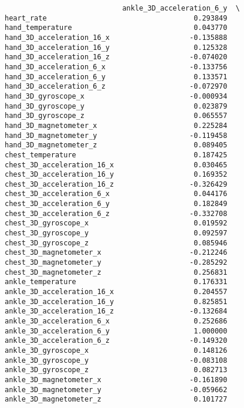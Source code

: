 \documentclass[11pt]{article}
\begin{document}
\begin{verbatim}
                            ankle_3D_acceleration_6_y  \
heart_rate                                   0.293849   
hand_temperature                             0.043770   
hand_3D_acceleration_16_x                   -0.135888   
hand_3D_acceleration_16_y                    0.125328   
hand_3D_acceleration_16_z                   -0.074020   
hand_3D_acceleration_6_x                    -0.133756   
hand_3D_acceleration_6_y                     0.133571   
hand_3D_acceleration_6_z                    -0.072970   
hand_3D_gyroscope_x                         -0.000934   
hand_3D_gyroscope_y                          0.023879   
hand_3D_gyroscope_z                          0.065557   
hand_3D_magnetometer_x                       0.225284   
hand_3D_magnetometer_y                      -0.119458   
hand_3D_magnetometer_z                       0.089405   
chest_temperature                            0.187425   
chest_3D_acceleration_16_x                   0.030465   
chest_3D_acceleration_16_y                   0.169352   
chest_3D_acceleration_16_z                  -0.326429   
chest_3D_acceleration_6_x                    0.044176   
chest_3D_acceleration_6_y                    0.182849   
chest_3D_acceleration_6_z                   -0.332708   
chest_3D_gyroscope_x                         0.019592   
chest_3D_gyroscope_y                         0.092597   
chest_3D_gyroscope_z                         0.085946   
chest_3D_magnetometer_x                     -0.212246   
chest_3D_magnetometer_y                     -0.285292   
chest_3D_magnetometer_z                      0.256831   
ankle_temperature                            0.176331   
ankle_3D_acceleration_16_x                   0.204557   
ankle_3D_acceleration_16_y                   0.825851   
ankle_3D_acceleration_16_z                  -0.132684   
ankle_3D_acceleration_6_x                    0.252686   
ankle_3D_acceleration_6_y                    1.000000   
ankle_3D_acceleration_6_z                   -0.149320   
ankle_3D_gyroscope_x                         0.148126   
ankle_3D_gyroscope_y                        -0.083108   
ankle_3D_gyroscope_z                         0.082713   
ankle_3D_magnetometer_x                     -0.161890   
ankle_3D_magnetometer_y                     -0.059662   
ankle_3D_magnetometer_z                      0.101727   


\end{verbatim}
\end{document}
